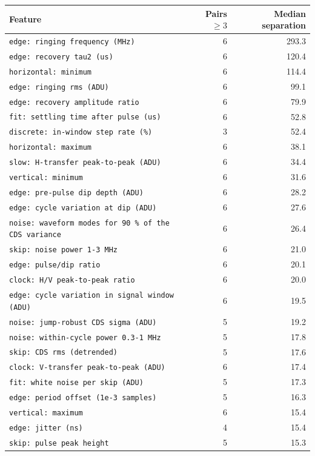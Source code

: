 \documentclass[10pt]{article}
\renewcommand{\_}{\oldunderscore\allowbreak}
\begin{document}
\begin{longtable}{>{\raggedright\arraybackslash}p{}rr}
\toprule Feature & Pairs $\geq 3$ & Median separation \\ \midrule \endhead
\bottomrule \endfoot
\texttt{edge: ringing frequency (MHz)} & 6 & 293.3 \\
\texttt{edge: recovery tau2 (us)} & 6 & 120.4 \\
\texttt{horizontal: minimum} & 6 & 114.4 \\
\texttt{edge: ringing rms (ADU)} & 6 & 99.1 \\
\texttt{edge: recovery amplitude ratio} & 6 & 79.9 \\
\texttt{fit: settling time after pulse (us)} & 6 & 52.8 \\
\texttt{discrete: in-window step rate (\%)} & 3 & 52.4 \\
\texttt{horizontal: maximum} & 6 & 38.1 \\
\texttt{slow: H-transfer peak-to-peak (ADU)} & 6 & 34.4 \\
\texttt{vertical: minimum} & 6 & 31.6 \\
\texttt{edge: pre-pulse dip depth (ADU)} & 6 & 28.2 \\
\texttt{edge: cycle variation at dip (ADU)} & 6 & 27.6 \\
\texttt{noise: waveform modes for 90 \% of the CDS variance} & 6 & 26.4 \\
\texttt{skip: noise power 1-3 MHz} & 6 & 21.0 \\
\texttt{edge: pulse/dip ratio} & 6 & 20.1 \\
\texttt{clock: H/V peak-to-peak ratio} & 6 & 20.0 \\
\texttt{edge: cycle variation in signal window (ADU)} & 6 & 19.5 \\
\texttt{noise: jump-robust CDS sigma (ADU)} & 5 & 19.2 \\
\texttt{noise: within-cycle power 0.3-1 MHz} & 5 & 17.8 \\
\texttt{skip: CDS rms (detrended)} & 5 & 17.6 \\
\texttt{clock: V-transfer peak-to-peak (ADU)} & 6 & 17.4 \\
\texttt{fit: white noise per skip (ADU)} & 5 & 17.3 \\
\texttt{edge: period offset (1e-3 samples)} & 5 & 16.3 \\
\texttt{vertical: maximum} & 6 & 15.4 \\
\texttt{edge: jitter (ns)} & 4 & 15.4 \\
\texttt{skip: pulse peak height} & 5 & 15.3 \\

\end{longtable}
\end{document}
